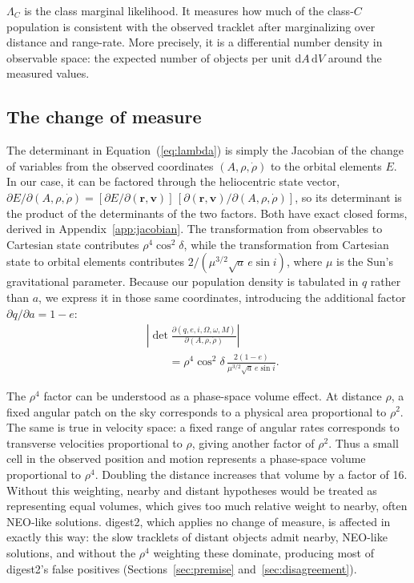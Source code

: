 \documentclass[linenumbers,twocolumn]{aastex701}
\newcommand{\dd}{\mathrm{d}}
\begin{document}
$\Lambda_C$ is the class marginal likelihood. It measures how
much of the class-$C$ population is consistent with the observed tracklet
after marginalizing over distance and range-rate. More precisely, it is a
differential number density in observable space: the expected number of
objects per unit $\dd A\,\dd V$ around the measured values.

\subsection{The change of measure}
\label{sec:jacobian}

The determinant in Equation~(\ref{eq:lambda}) is simply the Jacobian of the change
of variables from the observed coordinates $(A,\rho,\dot\rho)$ to the
orbital elements $E$. In our case, it can be factored through the
heliocentric state vector,
$\partial E/\partial(A,\rho,\dot\rho)=
[\partial E/\partial(\mathbf{r},\mathbf{v})]\,
[\partial(\mathbf{r},\mathbf{v})/\partial(A,\rho,\dot\rho)]$,
so its determinant is the product of the determinants of the two factors.
Both have exact closed forms, derived in
Appendix~\ref{app:jacobian}. The transformation from observables to
Cartesian state contributes $\rho^4\cos^2\delta$, while the transformation
from Cartesian state to orbital elements contributes
$2/(\mu^{3/2}\sqrt{a}\,e\sin i)$, where $\mu$ is the Sun's gravitational
parameter. Because our population density is tabulated in $q$ rather than
$a$, we express it in those same coordinates, introducing
the additional factor $\partial q/\partial a=1-e$:
\begin{align}
&\left|\det\frac{\partial(q,e,i,\Omega,\omega,M)}
{\partial(A,\rho,\dot\rho)}\right|
\nonumber\\
&\qquad = \rho^4\cos^2\delta\,
\frac{2(1-e)}{\mu^{3/2}\sqrt{a}\,e\sin i}.
\label{eq:jacqei}
\end{align}


The $\rho^4$ factor can be understood as a phase-space volume effect. At
distance $\rho$, a fixed angular patch on the sky corresponds to a physical
area proportional to $\rho^2$. The same is true in velocity space: a fixed
range of angular rates corresponds to transverse velocities proportional to
$\rho$, giving another factor of $\rho^2$. Thus a small cell in the observed
position and motion represents a phase-space volume proportional to
$\rho^4$. Doubling the distance increases that volume by a factor of 16.
Without this weighting, nearby and distant hypotheses would be treated as
representing equal volumes, which gives too much relative weight to nearby,
often NEO-like solutions. digest2, which applies no change of measure, is
affected in exactly this way: the slow tracklets of distant objects admit
nearby, NEO-like solutions, and without the $\rho^4$ weighting these
dominate, producing most of digest2's false positives
(Sections~\ref{sec:premise} and~\ref{sec:disagreement}).
\end{document}
